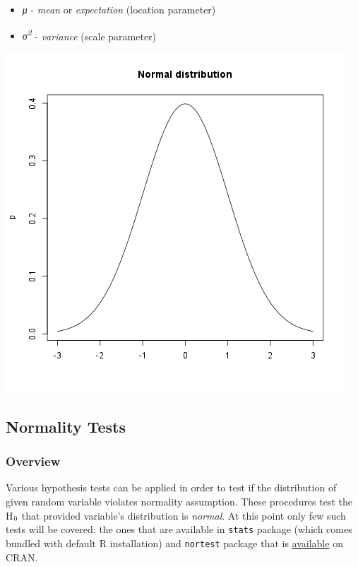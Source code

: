 \documentclass[]{article}
\makeatletter
\def\maxwidth{\ifdim\Gin@nat@width>\linewidth\linewidth
\else\Gin@nat@width\fi}
\let\Oldincludegraphics\includegraphics
\renewcommand{\includegraphics}[1]{\Oldincludegraphics[width=\maxwidth]{#1}}
\newcommand{\textsubscr}[1]{\ensuremath{_{\scriptsize\textrm{#1}}}}
\makeatother
\begin{document}
\begin{itemize}
\item
  \emph{μ} - \emph{mean} or \emph{expectation} (location parameter)
\item
  \emph{σ\textsuperscript{2}} - \emph{variance} (scale parameter)
\end{itemize}
\href{806ea97c59e1a12d4acae4968957aaa9-hires.png}{\includegraphics{806ea97c59e1a12d4acae4968957aaa9.png}}

\subsection{Normality Tests}

\subsubsection{Overview}

Various hypothesis tests can be applied in order to test if the
distribution of given random variable violates normality assumption.
These procedures test the H\textsubscr{0} that provided variable's
distribution is \emph{normal}. At this point only few such tests will be
covered: the ones that are available in \texttt{stats} package (which
comes bundled with default R installation) and \texttt{nortest} package
that is
\href{http://cran.r-project.org/web/packages/nortest/index.html}{available}
on CRAN.
\end{document}
